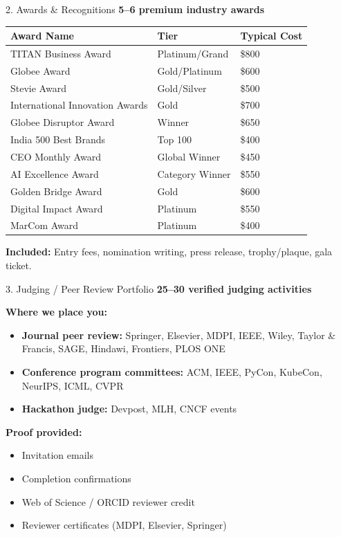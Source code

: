 \documentclass[aspectratio=169, 10pt]{beamer}
\begin{document}
	\begin{frame}{2. Awards \& Recognitions}
		\faTrophy \hspace{0.2cm} \textbf{5–6 premium industry awards}
		
		\begin{table}
			\centering
			\scriptsize
			\begin{tabular}{lll}
				\toprule
				Award Name & Tier & Typical Cost \\
				\midrule
				TITAN Business Award & Platinum/Grand & \$800 \\
				Globee Award & Gold/Platinum & \$600 \\
				Stevie Award & Gold/Silver & \$500 \\
				International Innovation Awards & Gold & \$700 \\
				Globee Disruptor Award & Winner & \$650 \\
				India 500 Best Brands & Top 100 & \$400 \\
				CEO Monthly Award & Global Winner & \$450 \\
				AI Excellence Award & Category Winner & \$550 \\
				Golden Bridge Award & Gold & \$600 \\
				Digital Impact Award & Platinum & \$550 \\
				MarCom Award & Platinum & \$400 \\
				\bottomrule
			\end{tabular}
		\end{table}
		
		\textbf{Included:} Entry fees, nomination writing, press release, trophy/plaque, gala ticket.
	\end{frame}
	
	\begin{frame}{3. Judging / Peer Review Portfolio}
		\faGavel \hspace{0.2cm} \textbf{25–30 verified judging activities}
		
		\textbf{Where we place you:}
		\begin{itemize}
			\item \textbf{Journal peer review:} Springer, Elsevier, MDPI, IEEE, Wiley, Taylor \& Francis, SAGE, Hindawi, Frontiers, PLOS ONE
			\item \textbf{Conference program committees:} ACM, IEEE, PyCon, KubeCon, NeurIPS, ICML, CVPR
			\item \textbf{Hackathon judge:} Devpost, MLH, CNCF events
		\end{itemize}
		
		\textbf{Proof provided:}
		\begin{itemize}
			\item Invitation emails
			\item Completion confirmations
			\item Web of Science / ORCID reviewer credit
			\item Reviewer certificates (MDPI, Elsevier, Springer)
		\end{itemize}
	\end{frame}
	
\end{document}
